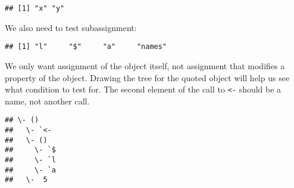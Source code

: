 \begin{Shaded}
\begin{Highlighting}[]
\NormalTok{(}\NormalTok{(\{}
  \StringTok{ }\StringTok{ }\NormalTok{))}
\NormalTok{\}))}
\end{Highlighting}
\end{Shaded}

\begin{verbatim}
## [1] "x" "y"
\end{verbatim}

We also need to test subassignment:

\begin{Shaded}
\begin{Highlighting}[]
\NormalTok{(}\NormalTok{(\{}
\StringTok{ }\NormalTok{()}
\OperatorTok{$}\StringTok{ }
\NormalTok{\}))}
\end{Highlighting}
\end{Shaded}

\begin{verbatim}
## [1] "l"     "$"     "a"     "names"
\end{verbatim}

We only want assignment of the object itself, not assignment that
modifies a property of the object. Drawing the tree for the quoted
object will help us see what condition to test for. The second element
of the call to \texttt{\textless{}-} should be a name, not another call.

\begin{Shaded}
\begin{Highlighting}[]
\OperatorTok{$}\StringTok{ }\NormalTok{)}
\end{Highlighting}
\end{Shaded}

\begin{verbatim}
## \- ()
##   \- `<-
##   \- ()
##     \- `$
##     \- `l
##     \- `a
##   \-  5
\end{verbatim}

\begin{Shaded}
\begin{Highlighting}[]
\NormalTok{(}\NormalTok{)}
\end{Highlighting}
\end{Shaded}


